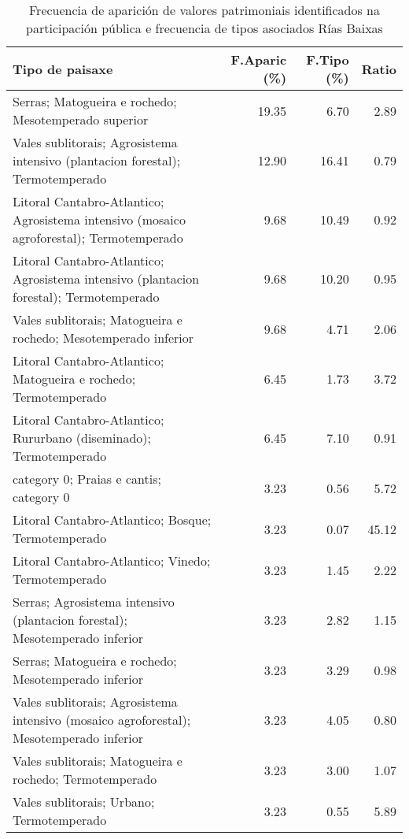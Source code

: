 \begin{table}[p]
\centering
\caption{Frecuencia de aparición de valores patrimoniais identificados na participación pública e frecuencia de tipos asociados Rías Baixas} 
\label{vsixotpat12}
\begin{tabular}{lrrr}
  \hline
Tipo de paisaxe & F.Aparic (\%) & F.Tipo (\%) & Ratio \\ 
  \hline
Serras; Matogueira e rochedo; Mesotemperado superior & 19.35 & 6.70 & 2.89 \\ 
  Vales sublitorais; Agrosistema intensivo (plantacion forestal); Termotemperado & 12.90 & 16.41 & 0.79 \\ 
  Litoral Cantabro-Atlantico; Agrosistema intensivo (mosaico agroforestal); Termotemperado & 9.68 & 10.49 & 0.92 \\ 
  Litoral Cantabro-Atlantico; Agrosistema intensivo (plantacion forestal); Termotemperado & 9.68 & 10.20 & 0.95 \\ 
  Vales sublitorais; Matogueira e rochedo; Mesotemperado inferior & 9.68 & 4.71 & 2.06 \\ 
  Litoral Cantabro-Atlantico; Matogueira e rochedo; Termotemperado & 6.45 & 1.73 & 3.72 \\ 
  Litoral Cantabro-Atlantico; Rururbano (diseminado); Termotemperado & 6.45 & 7.10 & 0.91 \\ 
  category 0; Praias e cantis; category 0 & 3.23 & 0.56 & 5.72 \\ 
  Litoral Cantabro-Atlantico; Bosque; Termotemperado & 3.23 & 0.07 & 45.12 \\ 
  Litoral Cantabro-Atlantico; Vinedo; Termotemperado & 3.23 & 1.45 & 2.22 \\ 
  Serras; Agrosistema intensivo (plantacion forestal); Mesotemperado inferior & 3.23 & 2.82 & 1.15 \\ 
  Serras; Matogueira e rochedo; Mesotemperado inferior & 3.23 & 3.29 & 0.98 \\ 
  Vales sublitorais; Agrosistema intensivo (mosaico agroforestal); Mesotemperado inferior & 3.23 & 4.05 & 0.80 \\ 
  Vales sublitorais; Matogueira e rochedo; Termotemperado & 3.23 & 3.00 & 1.07 \\ 
  Vales sublitorais; Urbano; Termotemperado & 3.23 & 0.55 & 5.89 \\ 
   \hline
\end{tabular}
\end{table}
